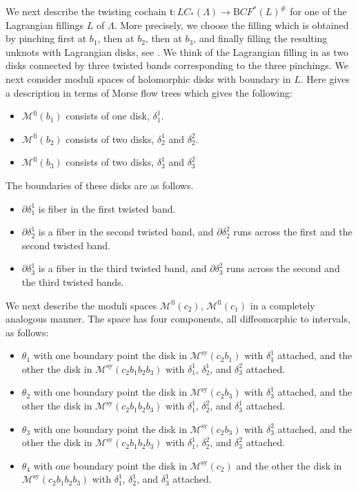 \documentclass{gtpart}
\renewcommand{\t}{\mathfrak{t}}
\renewcommand{\Bar}{\mathrm{B}}
\newcommand{\fl}{\mathrm{fi}}
\newcommand{\sy}{\mathrm{sy}}
\begin{document}
We next describe the twisting cochain $\t\colon LC_{\ast}(\Lambda)\to \Bar CF^{\ast}(L)^{\#}$ for one of the Lagrangian fillings $L$ of $\Lambda$. More precisely, we choose the filling which is obtained by pinching first at $b_{1}$, then at $b_{2}$, then at $b_{3}$, and finally filling the resulting unknots with Lagrangian disks, see \cite[Section 8.1]{EKH}. We think of the Lagrangian filling in as two disks connected by three twisted bands corresponding to the three pinchings. We next consider moduli spaces of holomorphic disks with boundary in $L$. Here \cite[Sections 4 and 5]{EKH} gives a description in terms of Morse flow trees which gives the following:
\begin{itemize}
\item $\mathcal{M}^{\fl}(b_{1})$ consists of one disk, $\delta_{1}^{1}$. 
\item $\mathcal{M}^{\fl}(b_{2})$ consists of two disks, $\delta_{2}^{1}$ and $\delta_{2}^{2}$.
\item $\mathcal{M}^{\fl}(b_{3})$ consists of two disks, $\delta_{3}^{1}$ and $\delta_{3}^{2}$
\end{itemize}
The boundaries of these disks are as follows.
\begin{itemize}
	\item $\partial \delta_{1}^{1}$ is fiber in the first twisted band.
	\item $\partial \delta_{2}^{1}$ is a fiber in the second twisted band, and $\partial \delta_{2}^{2}$ runs across the first and the second twisted band.
	\item $\partial\delta_{3}^{1}$ is a fiber in the third twisted band, and $\partial \delta_{3}^{2}$ runs across the second and the third twisted bands.
\end{itemize}
We next describe the moduli spaces $\mathcal{M}^{\fl}(c_{2})$, $\mathcal{M}^{\fl}(c_{1})$
in a completely analogous manner. The space has four components, all diffeomorphic to intervals, as follows:
\begin{itemize}
\item $\theta_{1}$ with one boundary point the disk in
    $\mathcal{M}^{\sy}(c_{2}b_{1})$ with $\delta_{1}^{1}$ attached, and the other the disk in
        $\mathcal{M}^{\sy}(c_{2}b_{1}b_{2}b_{3})$ with $\delta_{1}^{1}$, $\delta_{2}^{1}$, and $\delta_{3}^{2}$ attached.
\item $\theta_{2}$ with one boundary point the disk in
    $\mathcal{M}^{\sy}(c_{2}b_{3})$ with $\delta_{3}^{1}$ attached, and the other the disk in
        $\mathcal{M}^{\sy}(c_{2}b_{1}b_{2}b_{3})$ with $\delta_{1}^{1}$, $\delta_{2}^{2}$, and $\delta_{3}^{1}$ attached.
\item $\theta_{3}$ with one boundary point the disk in
    $\mathcal{M}^{\sy}(c_{2}b_{3})$ with $\delta_{3}^{2}$ attached, and the other the disk in
        $\mathcal{M}^{\sy}(c_{2}b_{1}b_{2}b_{3})$ with $\delta_{1}^{1}$, $\delta_{2}^{2}$, and $\delta_{3}^{2}$ attached.
\item $\theta_{4}$ with one boundary point the disk in $\mathcal{M}^{\sy}(c_{2})$ and the other the
    disk in $\mathcal{M}^{\sy}(c_{2}b_{1}b_{2}b_{3})$ with $\delta_{1}^{1}$, $\delta_{2}^{1}$, and $\delta_{3}^{1}$ attached.
\end{itemize}
\end{document}
